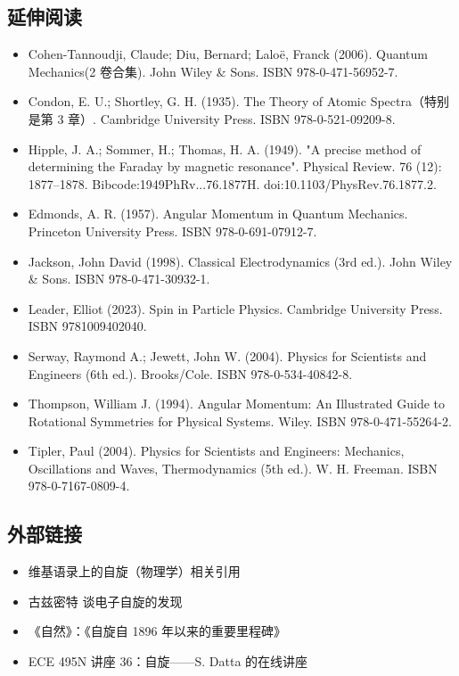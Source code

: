 \subsection{延伸阅读}  
\begin{itemize}
\item Cohen-Tannoudji, Claude; Diu, Bernard; Laloë, Franck (2006). Quantum Mechanics(2 卷合集). John Wiley & Sons. ISBN 978-0-471-56952-7.  
\item Condon, E. U.; Shortley, G. H. (1935). The Theory of Atomic Spectra（特别是第 3 章）. Cambridge University Press. ISBN 978-0-521-09209-8.  
\item Hipple, J. A.; Sommer, H.; Thomas, H. A. (1949). "A precise method of determining the Faraday by magnetic resonance". Physical Review. 76 (12): 1877–1878. Bibcode:1949PhRv...76.1877H. doi:10.1103/PhysRev.76.1877.2.  
\item Edmonds, A. R. (1957). Angular Momentum in Quantum Mechanics. Princeton University Press. ISBN 978-0-691-07912-7.  
\item Jackson, John David (1998). Classical Electrodynamics (3rd ed.). John Wiley & Sons. ISBN 978-0-471-30932-1.  
\item Leader, Elliot (2023). Spin in Particle Physics. Cambridge University Press. ISBN 9781009402040.  
\item Serway, Raymond A.; Jewett, John W. (2004). Physics for Scientists and Engineers (6th ed.). Brooks/Cole. ISBN 978-0-534-40842-8.  
\item Thompson, William J. (1994). Angular Momentum: An Illustrated Guide to Rotational Symmetries for Physical Systems. Wiley. ISBN 978-0-471-55264-2.  
\item Tipler, Paul (2004). Physics for Scientists and Engineers: Mechanics, Oscillations and Waves, Thermodynamics (5th ed.). W. H. Freeman. ISBN 978-0-7167-0809-4.  
\end{itemize}
\subsection{外部链接}
\begin{itemize}
\item 维基语录上的自旋（物理学）相关引用  
\item 古兹密特 谈电子自旋的发现 
\item 《自然》：《自旋自 1896 年以来的重要里程碑》 
\item ECE 495N 讲座 36：自旋——S. Datta 的在线讲座
\end{itemize}